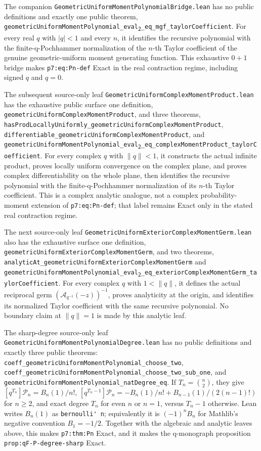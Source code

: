 \documentclass[11pt,oneside]{article}
\theoremstyle{definition}
\theoremstyle{remark}
\newcommand{\leansubtwo}[2]{%
  \nolinkurl{#1}\texttt{\textsubscript{2}}\nolinkurl{#2}}
\begin{document}
The companion
\nolinkurl{GeometricUniformMomentPolynomialBridge.lean} has no public
definitions and exactly one public theorem,
\leansubtwo{geometricUniformMomentPolynomial_eval}{_eq_mgf_taylorCoefficient}.
For every real \(q\) with \(\lvert q\rvert<1\) and every \(n\), it identifies
the recursive polynomial with the finite-q-Pochhammer normalization of the
\(n\)-th Taylor coefficient of the genuine geometric-uniform moment
generating function.  This exhaustive \(0+1\) bridge makes
\nolinkurl{p7:eq:Pn-def} Exact in the real contraction regime, including
signed \(q\) and \(q=0\).

The subsequent source-only leaf
\nolinkurl{GeometricUniformComplexMomentProduct.lean} has the exhaustive
public surface one definition,
\nolinkurl{geometricUniformComplexMomentProduct}, and three theorems,
\nolinkurl{hasProdLocallyUniformly_geometricUniformComplexMomentProduct},
\nolinkurl{differentiable_geometricUniformComplexMomentProduct}, and
\nolinkurl{geometricUniformMomentPolynomial_eval}\texttt{\textsubscript{2}}\nolinkurl{_eq_complexMomentProduct_taylorCoefficient}.
For every complex \(q\) with \(\lVert q\rVert<1\), it constructs the actual
infinite product, proves locally uniform convergence on the complex plane, and
proves complex differentiability on the whole plane, then identifies the
recursive polynomial with the finite-q-Pochhammer normalization of its
\(n\)-th Taylor coefficient.  This is a complex analytic analogue, not
a complex probability-moment extension of \nolinkurl{p7:eq:Pn-def}; that label
remains Exact only in the stated real contraction regime.

The next source-only leaf
\nolinkurl{GeometricUniformExteriorComplexMomentGerm.lean} also has the
exhaustive surface one definition,
\nolinkurl{geometricUniformExteriorComplexMomentGerm}, and two theorems,
\nolinkurl{analyticAt_geometricUniformExteriorComplexMomentGerm} and
\leansubtwo{geometricUniformMomentPolynomial_eval}{_eq_exteriorComplexMomentGerm_taylorCoefficient}.
For every complex \(q\) with \(1<\lVert q\rVert\), it defines the actual
reciprocal germ \((\mathcal A_{q^{-1}}(-z))^{-1}\), proves analyticity at the
origin, and identifies its normalized Taylor coefficient with the same
recursive polynomial.  No boundary claim at \(\lVert q\rVert=1\) is made by
this analytic leaf.

The sharp-degree source-only leaf
\nolinkurl{GeometricUniformMomentPolynomialDegree.lean} has no public
definitions and exactly three public theorems:
\nolinkurl{coeff_geometricUniformMomentPolynomial_choose_two},
\nolinkurl{coeff_geometricUniformMomentPolynomial_choose_two_sub_one}, and
\nolinkurl{geometricUniformMomentPolynomial_natDegree_eq}.  If
\(T_n=\binom n2\), they give
\([q^{T_n}]\mathcal P_n=B_n(1)/n!\),
\([q^{T_n-1}]\mathcal P_n=-B_n(1)/n!+B_{n-1}(1)/(2(n-1)!)\) for
\(n\geq2\), and exact degree \(T_n\) for even \(n\) or \(n=1\), versus
\(T_n-1\) otherwise.  Lean writes \(B_n(1)\) as
\nolinkurl{bernoulli' n}; equivalently it is \((-1)^nB_n\) for Mathlib's
negative convention \(B_1=-1/2\).  Together with the algebraic and analytic
leaves above, this makes \nolinkurl{p7:thm:Pn} Exact, and it makes the
q-monograph proposition \nolinkurl{prop:qF-P-degree-sharp} Exact.
\end{document}
